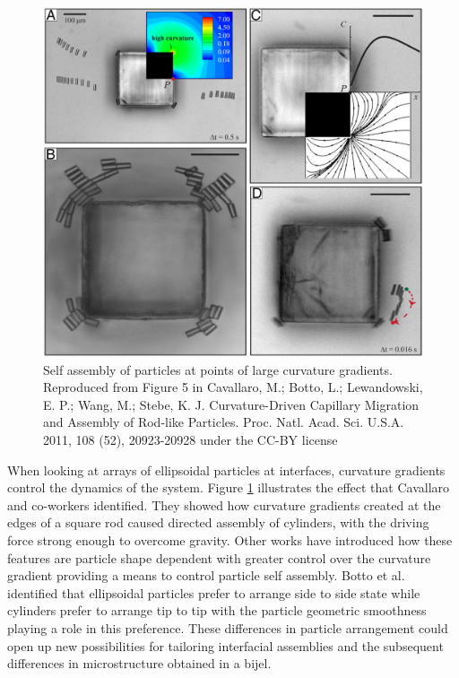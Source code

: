 \begin{figure}
    \centering
    \includegraphics[scale = 0.3]{../figures/literature_review/curvature_driven_assembly.jpeg}
    \caption{Self assembly of particles at points of large curvature gradients. Reproduced from Figure 5 in Cavallaro, M.; Botto, L.; 
             Lewandowski, E. P.; Wang, M.; Stebe, K. J. Curvature-Driven Capillary Migration and Assembly of Rod-like Particles. 
             Proc. Natl. Acad. Sci. U.S.A. 2011, 108 (52), 20923-20928 under the CC-BY license}
    \label{fig:curvature_gradient}
\end{figure}

When looking at arrays of ellipsoidal particles at interfaces, curvature gradients control the dynamics of the system. Figure \ref{fig:curvature_gradient} illustrates the effect that
Cavallaro and co-workers identified. They showed how curvature gradients created at the edges of a 
square rod caused directed assembly of cylinders, with the driving force strong enough to overcome gravity. \cite{cavallaro_curvature-driven_2011} Other works have introduced how these features are 
particle shape dependent with greater control over the curvature gradient providing a means to control particle self assembly. \cite{read_dimerization_2020, sharifi-mood_curvature_2015} Botto et al. 
identified that ellipsoidal particles prefer to arrange side to side state while cylinders prefer to arrange tip to tip with the particle geometric smoothness playing a role in this preference.
\cite{botto_capillary_2012} These differences in particle arrangement could open up new possibilities for tailoring interfacial assemblies and the subsequent differences in microstructure obtained in
a bijel.

